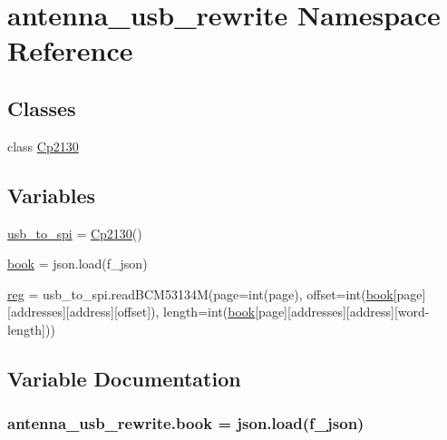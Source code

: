 \hypertarget{namespaceantenna__usb__rewrite}{}\section{antenna\+\_\+usb\+\_\+rewrite Namespace Reference}
\label{namespaceantenna__usb__rewrite}
\subsection*{Classes}
\begin{DoxyCompactItemize}
\item 
class \hyperlink{classantenna__usb__rewrite_1_1_cp2130}{Cp2130}
\end{DoxyCompactItemize}
\subsection*{Variables}
\begin{DoxyCompactItemize}
\item 
\hyperlink{namespaceantenna__usb__rewrite_ad962032e05d30ea5e906fa3535a0e2f3}{usb\+\_\+to\+\_\+spi} = \hyperlink{classantenna__usb__rewrite_1_1_cp2130}{Cp2130}()
\item 
\hyperlink{namespaceantenna__usb__rewrite_ac88e006e0f5fae02cb1c04b2630b3d9f}{book} = json.\+load(f\+\_\+json)
\item 
\hyperlink{namespaceantenna__usb__rewrite_af962b1046a96d9997df0dd7e5e3a8da9}{reg} = usb\+\_\+to\+\_\+spi.\+read\+B\+C\+M53134M(page=int(page), offset=int(\hyperlink{namespaceantenna__usb__rewrite_ac88e006e0f5fae02cb1c04b2630b3d9f}{book}\mbox{[}page\mbox{]}\mbox{[}\textquotesingle{}addresses\textquotesingle{}\mbox{]}\mbox{[}address\mbox{]}\mbox{[}\textquotesingle{}offset\textquotesingle{}\mbox{]}), length=int(\hyperlink{namespaceantenna__usb__rewrite_ac88e006e0f5fae02cb1c04b2630b3d9f}{book}\mbox{[}page\mbox{]}\mbox{[}\textquotesingle{}addresses\textquotesingle{}\mbox{]}\mbox{[}address\mbox{]}\mbox{[}\textquotesingle{}word-\/length\textquotesingle{}\mbox{]}))
\end{DoxyCompactItemize}


\subsection{Variable Documentation}
\subsubsection[{\texorpdfstring{book}{book}}]{\setlength{\rightskip}{0pt plus 5cm}antenna\+\_\+usb\+\_\+rewrite.\+book = json.\+load(f\+\_\+json)}\hypertarget{namespaceantenna__usb__rewrite_ac88e006e0f5fae02cb1c04b2630b3d9f}{}\label{namespaceantenna__usb__rewrite_ac88e006e0f5fae02cb1c04b2630b3d9f}


